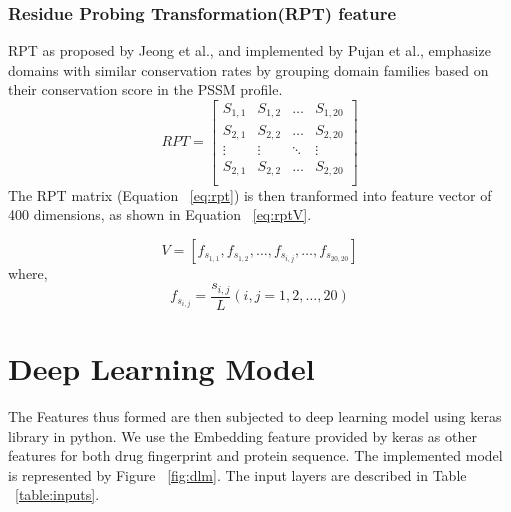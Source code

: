   \subsubsection{Residue Probing Transformation(RPT) feature}
  RPT as proposed by Jeong et al.\cite{Jeong2011}, and implemented by Pujan et al.\cite{Mishra2019}, emphasize domains with similar conservation rates by grouping domain families based on their conservation score in the PSSM profile.
  \begin{equation}
    RPT = \begin{bmatrix}
      S_{1,1} & S_{1,2} & \dots & S_{1,20} \\
      S_{2,1} & S_{2,2} & \dots & S_{2,20} \\
      \vdots  & \vdots  & \ddots & \vdots \\
      S_{2,1} & S_{2,2} & \dots & S_{2,20} \\
    \end{bmatrix}
    \label{eq:rpt}
  \end{equation}
  The RPT matrix (Equation ~\ref{eq:rpt}) is then tranformed into feature vector of 400 dimensions, as shown in Equation ~\ref{eq:rptV}.
  
  \begin{equation}
    V = [ f_{s_{1,1}}, f_{s_{1,2}}, \dots, f_{s_{i,j}}, \dots, f_{s_{20,20}} ]
    \label{eq:rptV}
  \end{equation}
  where, 
  \begin{equation}
    f_{s_{i,j}} = \frac{s_{i,j}}{L} (i,j = 1,2,\dots,20)
    \label{eq:rptF}
  \end{equation}
  
  
  \section{Deep Learning Model}
  
  The Features thus formed are then subjected to deep learning model using keras library in python. We use the Embedding feature provided by keras as other features for both drug fingerprint and protein sequence. The implemented model is represented by Figure ~\ref{fig:dlm}. The input layers are described in Table ~\ref{table:inputs}.
  
